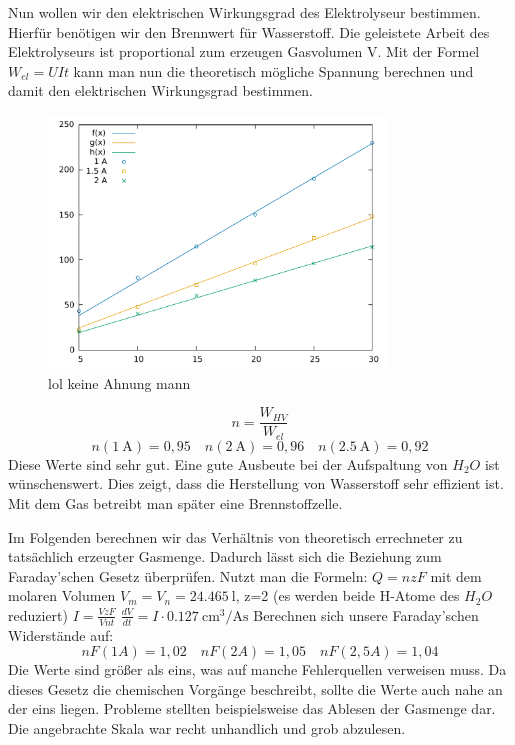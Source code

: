 Nun wollen wir den elektrischen Wirkungsgrad des Elektrolyseur bestimmen. Hierfür benötigen wir den Brennwert für Wasserstoff. 
Die geleistete Arbeit des Elektrolyseurs ist proportional zum erzeugen Gasvolumen V. Mit der Formel $W_{el}=UIt$ kann man nun die theoretisch mögliche Spannung berechnen und damit den elektrischen Wirkungsgrad bestimmen.
\begin{figure}[htbp]
	\centering
	\includegraphics[width=0.8\textwidth]{mess/aufg8.pdf}
	\caption{lol keine Ahnung mann}
	\label{a8}
\end{figure}

\[ n=\frac{W_{HV}}{W_{el}} \]
\[
n(\SI{1}{\ampere})=0,95 \quad
n(\SI{2}{\ampere})=0,96 \quad
n(\SI{2,5}{\ampere})=0,92
\]
Diese Werte sind sehr gut. Eine gute Ausbeute bei der Aufspaltung von $H_2O$ ist wünschenswert. Dies zeigt, dass die Herstellung von Wasserstoff sehr effizient ist. Mit dem Gas betreibt man später eine Brennstoffzelle.

Im Folgenden berechnen wir das Verhältnis von theoretisch errechneter zu tatsächlich erzeugter Gasmenge. Dadurch lässt sich die Beziehung zum Faraday’schen Gesetz überprüfen. Nutzt man die Formeln:
$Q=nzF$
mit dem molaren Volumen $V_m=V_n=\SI{24,465}{\litre}$,
z=2 (es werden beide H-Atome des $H_2O$ reduziert)
$I=\frac{VzF}{Vnt}$
$\frac{dV}{dt}=I \cdot \SI{0.127}{\centi \meter \cubed \per \ampere \second}$
Berechnen sich unsere Faraday’schen Widerstände auf:
\[
nF(1A)=1,02 \quad nF(2A) = 1,05 \quad nF(2,5A)=1,04
\]
Die Werte sind größer als eins, was auf manche Fehlerquellen verweisen muss. Da dieses Gesetz die chemischen Vorgänge beschreibt, sollte die Werte auch nahe an der eins liegen. Probleme stellten beispielsweise das Ablesen der Gasmenge dar. Die angebrachte Skala war recht unhandlich und grob abzulesen.

